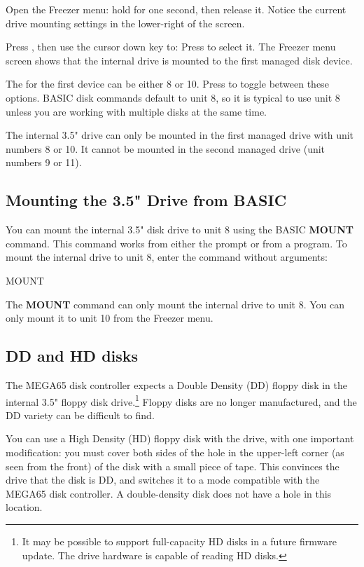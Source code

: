 Open the Freezer menu: hold  for one second, then release it. Notice the current drive mounting settings in the lower-right of the screen.

Press , then use the cursor down key to:  Press  to select it. The Freezer menu screen shows that the internal drive is mounted to the first managed disk device.

The  for the first device can be either 8 or 10. Press  to toggle between these options. BASIC disk commands default to unit 8, so it is typical to use unit 8 unless you are working with multiple disks at the same time.

The internal 3.5" drive can only be mounted in the first managed drive with unit numbers 8 or 10. It cannot be mounted in the second managed drive (unit numbers 9 or 11).

\subsection{Mounting the 3.5" Drive from BASIC}

You can mount the internal 3.5" disk drive to unit 8 using the BASIC {\bf MOUNT} command. This command works from either the  prompt or from a program. To mount the internal drive to unit 8, enter the command without arguments:

\begin{screencode}
MOUNT
\end{screencode}

The {\bf MOUNT} command can only mount the internal drive to unit 8. You can only mount it to unit 10 from the Freezer menu.

\subsection{DD and HD disks}

The MEGA65 disk controller expects a Double Density (DD) floppy disk in the internal 3.5" floppy disk drive.\footnote{It may be possible to support full-capacity HD disks in a future firmware update. The drive hardware is capable of reading HD disks.} Floppy disks are no longer manufactured, and the DD variety can be difficult to find.

You can use a High Density (HD) floppy disk with the drive, with one important modification: you must cover both sides of the hole in the upper-left corner (as seen from the front) of the disk with a small piece of tape. This convinces the drive that the disk is DD, and switches it to a mode compatible with the MEGA65 disk controller. A double-density disk does not have a hole in this location.

